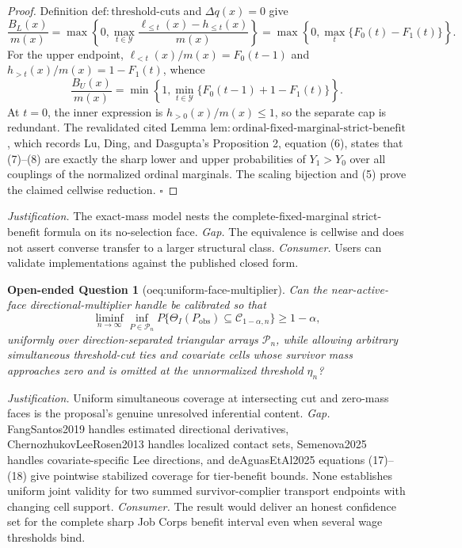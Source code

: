 \documentclass{article}
\newtheorem{openendedquestion}{Open-ended Question}
\begin{document}
\begin{proof}
Definition \(\mathrm{def{:}threshold\text{-}cuts}\) and \(\Delta q(x)=0\)
give
\[
\frac{B_L(x)}{m(x)}
=\max\left\{0,\max_{t\in\mathcal Y}
\frac{\ell_{\le t}(x)-h_{\le t}(x)}{m(x)}\right\}
=\max\left\{0,\max_t\{F_0(t)-F_1(t)\}\right\}.
\tag{7}
\]
For the upper endpoint,
\(\ell_{<t}(x)/m(x)=F_0(t-1)\) and
\(h_{>t}(x)/m(x)=1-F_1(t)\), whence
\[
\frac{B_U(x)}{m(x)}
=\min\left\{1,\min_{t\in\mathcal Y}
\{F_0(t-1)+1-F_1(t)\}\right\}.
\tag{8}
\]
At \(t=0\), the inner expression is \(h_{>0}(x)/m(x)\le1\), so the
separate cap is redundant.  The revalidated cited Lemma
\(\mathrm{lem{:}ordinal\text{-}fixed\text{-}marginal\text{-}strict\text{-}benefit}\),
which records Lu, Ding, and Dasgupta's Proposition 2, equation (6), states
that (7)--(8) are exactly the sharp lower and upper probabilities of
\(Y_1>Y_0\) over all couplings of the normalized ordinal marginals.  The
scaling bijection and (5) prove the claimed cellwise reduction. \(\square\)
\end{proof}
\par\smallskip\noindent \textit{Justification.} The exact-mass model nests the complete-fixed-marginal strict-benefit formula on its no-selection face. \textit{Gap.} The equivalence is cellwise and does not assert converse transfer to a larger structural class. \textit{Consumer.} Users can validate implementations against the published closed form.

\begin{openendedquestion}[oeq:uniform-face-multiplier]\label{oeq:uniform-face-multiplier}
Can the near-active-face directional-multiplier handle be calibrated so that \[\liminf_{n\to\infty}\inf_{P\in\mathcal P_n}P\{\Theta_I(P_{\mathrm{obs}})\subseteq\mathcal C_{1-\alpha,n}\}\ge1-\alpha,\] uniformly over direction-separated triangular arrays \(\mathcal P_n\), while allowing arbitrary simultaneous threshold-cut ties and covariate cells whose survivor mass approaches zero and is omitted at the unnormalized threshold \(\eta_n\)?
\end{openendedquestion}
\par\smallskip\noindent \textit{Justification.} Uniform simultaneous coverage at intersecting cut and zero-mass faces is the proposal's genuine unresolved inferential content. \textit{Gap.} FangSantos2019 handles estimated directional derivatives, ChernozhukovLeeRosen2013 handles localized contact sets, Semenova2025 handles covariate-specific Lee directions, and deAguasEtAl2025 equations (17)--(18) give pointwise stabilized coverage for tier-benefit bounds. None establishes uniform joint validity for two summed survivor-complier transport endpoints with changing cell support. \textit{Consumer.} The result would deliver an honest confidence set for the complete sharp Job Corps benefit interval even when several wage thresholds bind.
\end{document}
